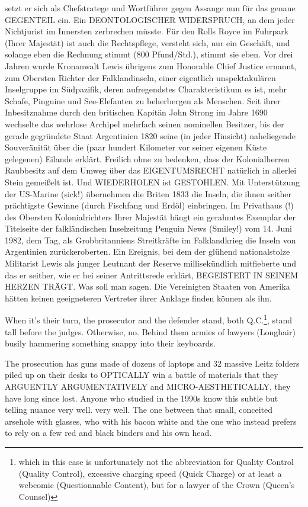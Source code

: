 \begin{multicols}{2}
{setzt er sich als Chefstratege und Wortführer gegen Assange nun für das genaue GEGENTEIL ein. Ein DEONTOLOGISCHER WIDERSPRUCH, an dem jeder Nichtjurist im Innersten zerbrechen müsste. Für den Rolls
Royce im Fuhrpark (Ihrer Majestät) ist auch die Rechtspflege, versteht sich, nur ein Geschäft, und solange eben
die Rechnung stimmt (800 Pfund/Std.), stimmt sie eben.
\textCR
Vor drei Jahren wurde Kronanwalt Lewis übrigens zum
Honorable Chief Justice ernannt, zum Obersten Richter
der Falklandinseln, einer eigentlich unspektakulären Inselgruppe im Südpazifik, deren aufregendstes Charakteristikum es ist, mehr Schafe, Pinguine und See-Elefanten
zu beherbergen als Menschen. Seit ihrer Inbesitznahme
durch den britischen Kapitän John Strong im Jahre 1690
wechselte das wehrlose Archipel mehrfach seinen nominellen Besitzer, bis der gerade gegründete Staat Argentinien 1820 seine (in jeder Hinsicht) naheliegende
Souveränität über die (paar hundert Kilometer vor seiner eigenen Küste gelegenen) Eilande erklärt. Freilich
ohne zu bedenken, dass der Kolonialherren Raubbesitz
auf dem Umweg über das EIGENTUMSRECHT natürlich
in allerlei Stein gemeißelt ist. Und WIEDERHOLEN ist
GESTOHLEN. Mit Unterstützung der US-Marine (sick!)
übernehmen die Briten 1833 die Inseln, die ihnen seither prächtigste Gewinne (durch Fischfang und Erdöl)
einbringen.
\textCR
Im Privathaus (!) des Obersten Kolonialrichters Ihrer Majestät hängt ein gerahmtes Exemplar der Titelseite der
falkländischen Inselzeitung Penguin News (Smiley!) vom
14. Juni 1982, dem Tag, als Grobbritanniens Streitkräfte im Falklandkrieg die Inseln von Argentinien zurückeroberten. Ein Ereignis, bei dem der glühend nationalstolze Militarist Lewis als junger Leutnant der Reserve
millisekündlich mitfieberte und das er seither, wie er
bei seiner Antrittsrede erklärt, BEGEISTERT IN SEINEM
HERZEN TRÄGT.
\textCR
Was soll man sagen. Die Vereinigten Staaten von Amerika hätten keinen geeigneteren Vertreter ihrer Anklage
finden können als ihn.}

When it's their turn, the prosecutor and the defender stand,
both Q.C.\footnote[11]{which in this case is unfortunately not the abbreviation for Quality Control (Quality Control), excessive charging speed (Quick Charge) or at least a webcomic (Questionnable Content), but for a lawyer of the Crown (Queen's Counsel)}, stand tall before the judges. Otherwise, no.
Behind them armies of lawyers (Longhair) busily hammering something snappy into their keyboards.

The prosecution has guns made of dozens of laptops
and 32 massive Leitz folders piled up on their desks to OPTICALLY win a battle of materials that they ARGUENTLY
ARGUMENTATIVELY and MICRO-AESTHETICALLY, they have long since lost. Anyone who studied in the 1990s
know this subtle but telling nuance very well.
very well. The one between that small, conceited arsehole with glasses, who with his bacon white
and the one who instead prefers to rely on a few red and black binders and his own head.


\end{multicols}
